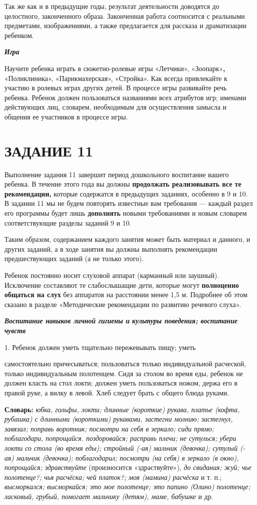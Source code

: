 \documentclass[a5paper]{book}
\renewcommand{\emph}[1]{\textit{#1}}
\begin{document}
Так же как и в предыдущие годы, результат деятельности доводятся до
целостного, законченного образа. Законченная работа соотносится с
реальными предметами, изображениями, а также предлагается для рассказа и
драматизации ребенком.

\emph{\textbf{Игра}}

Научите ребенка играть в сюжетно-ролевые игры «Летчики»,
«Зоопарк»\textbf{,} «Поликлиника», «Парикмахерская», «Стройка». Как
всегда привлекайте к участию в ролевых играх других детей. В процессе
игры развивайте речь ребенка. Ребенок должен пользоваться названиями
всех атрибутов игр; именами действующих лиц, словарем, необходимым для
осуществления замысла и общения ее участников в процессе игры.

\section{ЗАДАНИЕ 11}

Выполнение задания 11 завершит период дошкольного воспитание вашего
ребенка. В течение этого года вы должны \textbf{продолжать реализовывать
все те рекомендации,} которые содержатся в предыдущих заданиях, особенно
в 9 и 10. В задании 11 мы не будем повторять известные вам требования
--- каждый раздел его программы будет лишь \textbf{дополнять} новыми
требованиями и новым словарем соответствующие разделы заданий 9 и 10.

Таким образом, содержанием каждого занятия может быть материал и
данного, и других заданий, а в ходе занятия вы должны выполнять
рекомендации предшествующих заданий (а не только этого).

Ребенок постоянно носит слуховой аппарат (карманный или заушный).
Исключение составляют те слабослышащие дети, которые могут
\textbf{полноценно общаться на слух} без аппаратов на расстоянии менее
1,5 м. Подробнее об этом сказано в разделе «Методические рекомендации по
развитию речевого слуха».

\emph{\textbf{Воспитание навыков личной гигиены и} \textbf{культуры
поведения; воспитание чувств}}

1. Ребенок должен уметь тщательно пережевывать пищу; уметь

самостоятельно причесываться; пользоваться только индивидуальной
расческой, только индивидуальным полотенцем. Сидя за столом во время
еды, ребенок не должен класть на стол локти; должен уметь пользоваться
ножом, держа его в правой руке, а вилку в левой. Хлеб следует брать с
общего блюда руками.

\textbf{Словарь:} \emph{юбка, гольфы, локти; длинные (короткие) рукава,
платье (кофта, рубашка) с длинными (короткими) рукавами, застегни
молнию; застегнул, завязал; поправь воротник; посмотри на себя в
зеркало; сиди прямо; поблагодари, попрощайся. поздоровайся; расправь
плечи; не сутулься; убери локти со стола (во время еды); стройный (-ая)
мальчик (девочка); сутулый (-ая) мальчик (девочка); поблагодарил;
посмотри (на себя) в зеркало (в окно), попрощайся; здравствуйте}
(произносится «здраствуйте»), \emph{до свидания; жуй; чье полотенце?;
чья расчёска; чей платок?; моя (мамина) расчёска} и т. п.;
\emph{высморкался; высморкайся; это мое полотенце; это папино (Олино)
полотенце; ласковый, грубый, помогает мальчику (детям), маме, бабушке} и
др.
\end{document}
